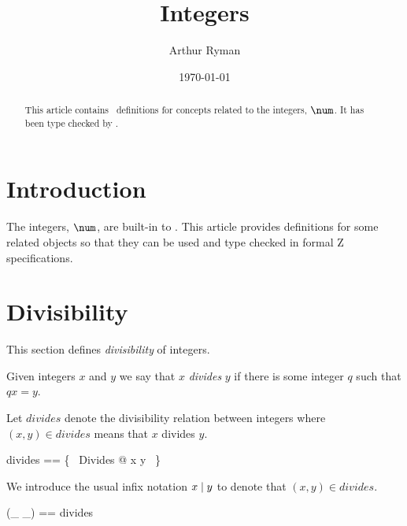 \documentclass{amsart}
\begin{document}
\title{Integers}
\author{Arthur Ryman}
\date{\today}

\begin{abstract}
This article contains \ZN\ definitions for 
concepts related to the integers, $\num$.
It has been type checked by \fuzz.
\end{abstract}

\maketitle

\tableofcontents

\section{Introduction}

The integers, $\num$, are built-in to \ZN.
This article provides definitions for some related objects so that they can be used and type checked in formal Z specifications.

\section{Divisibility}

This section defines \textit{divisibility} of integers.

Given integers $x$ and $y$ we say that $x$ \textit{divides} $y$ if there is some integer $q$ such 
that $q x = y$.


Let $divides$ denote the divisibility relation between integers
where $(x,y) \in divides$ means that $x$ divides $y$.

\begin{zed}
	divides == \{~ Divides @ x \mapsto y ~\}
\end{zed}

\begin{remark}
\end{remark}

We introduce the usual infix notation $x \mathrel{\mid} y$ to denote that $(x, y) \in divides$.
\begin{zed}
(\_ \divides \_) == divides
\end{zed}
\end{document}
